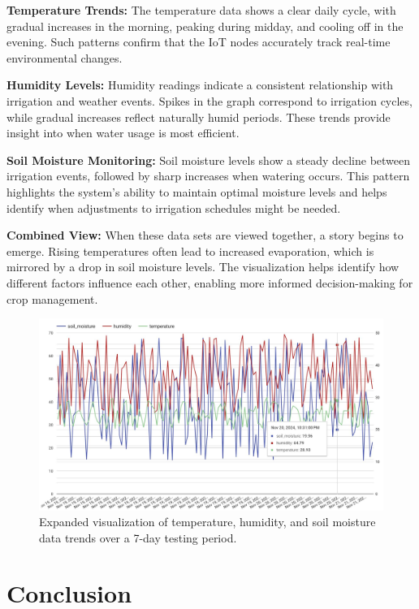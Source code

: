 \documentclass[runningheads]{llncs}
\begin{document}
\textbf{Temperature Trends:}  
The temperature data shows a clear daily cycle, with gradual increases in the morning, peaking during midday, and cooling off in the evening. Such patterns confirm that the IoT nodes accurately track real-time environmental changes.

\textbf{Humidity Levels:}  
Humidity readings indicate a consistent relationship with irrigation and weather events. Spikes in the graph correspond to irrigation cycles, while gradual increases reflect naturally humid periods. These trends provide insight into when water usage is most efficient.

\textbf{Soil Moisture Monitoring:}  
Soil moisture levels show a steady decline between irrigation events, followed by sharp increases when watering occurs. This pattern highlights the system’s ability to maintain optimal moisture levels and helps identify when adjustments to irrigation schedules might be needed.

\textbf{Combined View:}  
When these data sets are viewed together, a story begins to emerge. Rising temperatures often lead to increased evaporation, which is mirrored by a drop in soil moisture levels. The visualization helps identify how different factors influence each other, enabling more informed decision-making for crop management.

\begin{figure}[H]
\centering
\includegraphics[width=\textwidth]{results_image.png}
\caption{Expanded visualization of temperature, humidity, and soil moisture data trends over a 7-day testing period.}
\label{fig:expanded_visualization}
\end{figure}

\section{Conclusion}
\end{document}
